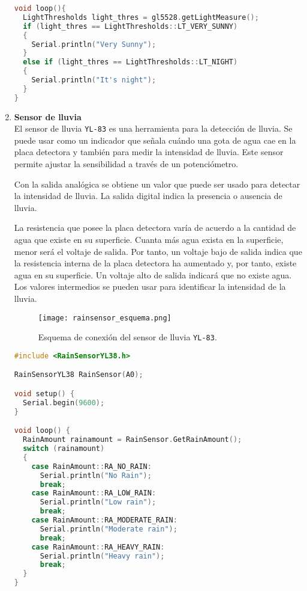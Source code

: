 \begin{enumerate}
\begin{lstlisting}[language=c++,captionpos=t,caption={\textbf{Utilización básica del sensor GL5528.}},label={lst:basicgl5528}]
void loop(){  
  LightThresholds light_thres = gl5528.getLightMeasure();  
  if (light_thres == LightThresholds::LT_VERY_SUNNY)
  {
    Serial.println("Very Sunny"); 
  }
  else if (light_thres == LightThresholds::LT_NIGHT)
  {
    Serial.println("It's night");  
  }
}
\end{lstlisting}

\vspace*{0.3in}


\item \textbf{Sensor de lluvia} \\
El sensor de lluvia \texttt{YL-83} es una herramienta para la detección de lluvia. Se puede usar como un indicador que señala cuándo una gota de agua cae en la placa detectora y también para medir la intensidad de lluvia. Este sensor permite ajustar la sensibilidad a través de un potenciómetro.

Con la salida analógica se obtiene un valor que puede ser usado para detectar la intensidad de lluvia. La salida digital indica la presencia o ausencia de lluvia. 

La resistencia que posee la placa detectora varía de acuerdo a la cantidad de agua que existe en su superficie. Cuanta más agua exista en la superficie, menor será el voltaje de salida. Por tanto, un voltaje bajo de salida indica que la resistencia interna de la placa detectora ha aumentado y, por tanto, existe agua en su superficie. Un voltaje alto de salida indicará que no existe agua. Los valores intermedios se pueden usar para identificar la intensidad de la lluvia.


\begin{figure}[!h]
\begin{center}
\texttt{[image: rainsensor\_esquema.png]}
\caption{Esquema de conexión del sensor de lluvia \texttt{YL-83}.}
\label{fig:yl83}
\end{center}
\end{figure}

\begin{lstlisting}[language=c++,captionpos=t,caption={\textbf{Utilización básica del sensor de lluvia YL38.}},label={lst:basicYL38}]
#include <RainSensorYL38.h>

RainSensorYL38 RainSensor(A0);

void setup() {
  Serial.begin(9600);
}

void loop() {
  RainAmount rainamount = RainSensor.GetRainAmount();
  switch (rainamount)
  {
    case RainAmount::RA_NO_RAIN:
      Serial.println("No Rain");
      break;
    case RainAmount::RA_LOW_RAIN:
      Serial.println("Low rain");
      break;
    case RainAmount::RA_MODERATE_RAIN:
      Serial.println("Moderate rain");
      break;
    case RainAmount::RA_HEAVY_RAIN:
      Serial.println("Heavy rain");
      break;
  }
}
\end{lstlisting}


\end{enumerate}
